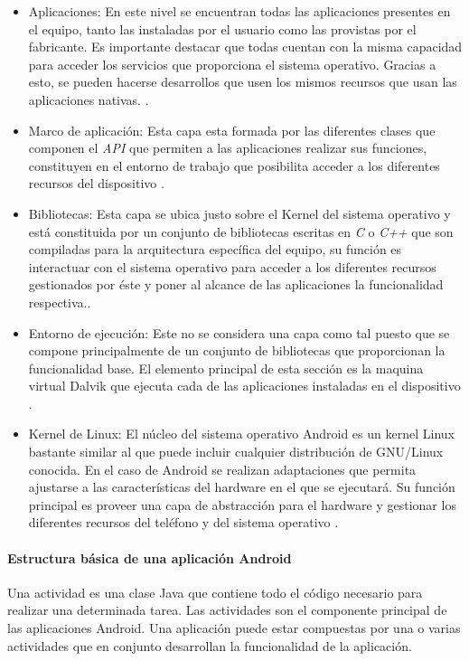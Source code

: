 \begin{itemize}
\item Aplicaciones: En este nivel se encuentran todas las aplicaciones presentes en el equipo, tanto las instaladas por el usuario como las provistas por el fabricante. Es importante destacar que todas cuentan con la misma capacidad para acceder los servicios que proporciona el sistema operativo. Gracias a esto, se pueden hacerse desarrollos que usen los mismos recursos que usan las aplicaciones nativas. \cite{AAT}.
\item Marco de aplicación: Esta capa esta formada por las diferentes clases que componen el \textit{API} que permiten a las aplicaciones realizar sus funciones, constituyen en el entorno de trabajo que posibilita acceder a los diferentes recursos del dispositivo \cite{AAT}.
\item Bibliotecas: Esta capa se ubica justo sobre el Kernel del sistema operativo y está constituida por un conjunto de bibliotecas escritas en \textit{C} o \textit{C++} que son compiladas para la arquitectura específica del equipo, su función es interactuar con el sistema operativo para acceder a los diferentes recursos gestionados por éste y poner al alcance de las aplicaciones la funcionalidad respectiva.\cite{AAT}. 
\item Entorno de ejecución: Este no se considera una capa como tal puesto que se compone principalmente de un conjunto de bibliotecas que proporcionan la funcionalidad base. El elemento principal de esta sección es la maquina virtual Dalvik que ejecuta cada de las aplicaciones instaladas en el dispositivo \cite{AAT}. 
\item Kernel de Linux: El núcleo del sistema operativo Android es un kernel Linux bastante similar al que puede incluir cualquier distribución de GNU/Linux conocida. En el caso de Android se realizan adaptaciones que permita ajustarse a las características del hardware en el que se ejecutará. Su función principal es proveer una capa de abstracción para el hardware y gestionar los diferentes recursos del teléfono y del sistema operativo \cite{AAT}.
\end{itemize}

\paragraph{Estructura básica de una aplicación Android}\mbox{}

Una actividad es una clase Java que contiene todo el código necesario para realizar una determinada tarea. Las actividades son el componente principal de las aplicaciones Android. Una aplicación puede estar compuestas por una o varias actividades que en conjunto desarrollan la funcionalidad de la aplicación. 

